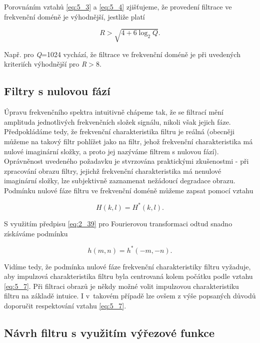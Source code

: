Porovnáním vztahů \eqref{eq:5_3} a \eqref{eq:5_4} zjišťujeme, že provedení filtrace ve frekvenční doméně je výhodnější, jestliže platí

\begin{equation} \label{eq:5_5}
    R > \sqrt{4 + 6 \log_2 Q}.
\end{equation}

Např. pro \textit{Q}=1024 vychází, že filtrace ve frekvenční doméně je při uvedených kriteriích výhodnější pro \textit{R}$>$8.

\subsection*{Filtry s nulovou fází}

Úpravu frekvenčního spektra intuitivně chápeme tak, že se filtrací mění amplituda jednotlivých frekvenčních složek signálu, nikoli však jejich fáze. Předpokládáme tedy, že frekvenční charakteristika filtru je reálná (obecněji můžeme na takový filtr pohlížet jako na filtr, jehož frekvenční charakteristika má nulové imaginární složky, a proto jej nazýváme filtrem s nulovou fází). Oprávněnost uvedeného požadavku je stvrzována praktickými zkušenostmi - při zpracování obrazu filtry, jejichž frekvenční charakteristika má nenulové imaginární složky, lze subjektivně zaznamenat nežádoucí degradace obrazu. Podmínku nulové fáze filtru ve frekvenční doméně můžeme zapsat pomocí vztahu

\begin{equation} \label{eq:5_6}
    H(k, l) = H^*(k, l).
\end{equation}

S využitím předpisu \eqref{eq:2_39} pro Fourierovou transformaci odtud snadno získáváme podmínku

\begin{equation} \label{eq:5_7}
    h(m, n) = h^*(-m, -n).
\end{equation}

Vidíme tedy, že podmínka nulové fáze frekvenční charakteristiky filtru vyžaduje, aby impulzová charakteristika filtru byla centrovaná kolem počátku podle vztahu \eqref{eq:5_7}. Při filtraci obrazů je někdy možné volit impulzovou charakteristiku filtru na základě intuice. I v~takovém případě lze ovšem z výše popsaných důvodů doporučit respektování vztahu \eqref{eq:5_7}. 

\subsection*{Návrh filtru s využitím výřezové funkce}


